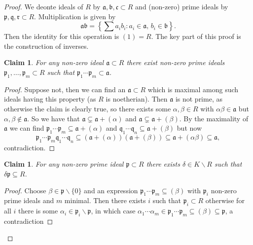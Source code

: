 \documentclass[10pt,]{book}
\theoremstyle{plain}
\newtheorem{claim}[theorem]{Claim}
\theoremstyle{definition}
\newcommand{\fa}{\mathfrak{a}}
\newcommand{\fb}{\mathfrak{b}}
\newcommand{\fc}{\mathfrak{c}}
\newcommand{\fp}{\mathfrak{p}}
\newcommand{\fq}{\mathfrak{q}}
\newcommand{\fr}{\mathfrak{r}}
\begin{document}
\begin{proof}
We deonte ideals of \(R\) by \(\fa,\fb,\fc\subset R\) and (non-zero) prime ideals by \(\fp,\fq,\fr\subset R\).
            Multiplication is given by \[\fa\fb = \left\{ \sum a_ib_i : a_i \in \fa,\,b_i\in \fb\right\}.\]
            Then the identity for this operation is \((1) = R\).
            The key part of this proof is the construction of inverses.
            \begin{claim}\label{claim-1}
For any non-zero ideal \(\fa \subset R\) there exist non-zero prime ideals \(\fp_1,\ldots,\fp_m\subset R\) such that \(\fp_1\cdots \fp_m\subset \fa\).\end{claim}
\begin{proof}
Suppose not, then we can find an \(\fa \subset R\) which is maximal among such ideals having this property (as \(R\) is noetherian).
                Then \(\fa\) is not prime, as otherwise the claim is clearly true, so there exists some \(\alpha,\beta\in R\) with \(\alpha\beta \in \fa\) but \(\alpha,\beta \notin \fa\).
                So we have that \(\fa \subsetneq \fa + (\alpha)\) and \(\fa \subsetneq \fa + (\beta)\).
                By the maximality of \(\fa\) we can find \(\fp_1 \cdots \fp_m \subseteq \fa + (\alpha) \) and \(\fq_1 \cdots \fq_n \subseteq \fa + (\beta)\) but now
                \[\fp_1 \cdots \fp_m\fq_1\cdots \fq_n\subseteq(\fa + (\alpha))(\fa + (\beta)) \subseteq \fa + (\alpha\beta) \subseteq \fa,\]
                contradiction.
              \end{proof}
\begin{claim}\label{claim-2}
For any non-zero prime ideal \(\fp\subset R\) there exists \(\delta \in K\smallsetminus R\) such that \(\delta \fp \subseteq R\).\end{claim}
\begin{proof}
Choose \(\beta\in \fp \smallsetminus \{0\}\) and an expression \(\fp_1\cdots \fp_m \subseteq (\beta)\) with \(\fp_i\) non-zero prime ideals and \(m\) minimal.
                Then there exists \(i\) such that \(\fp_i\subset R\) otherwise for all \(i\) there is some \(\alpha_i \in\fp_i \smallsetminus\fp\), in which case \(\alpha_1\cdots \alpha_m\in \fp_1\cdots \fp_m\subseteq (\beta) \subseteq \fp\), a contradiction 
              \end{proof}
\end{proof}
%
\backmatter
%
\end{document}
